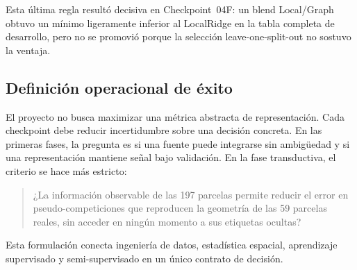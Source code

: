 Esta última regla resultó decisiva en Checkpoint~04F: un blend Local/Graph obtuvo un mínimo
ligeramente inferior al LocalRidge en la tabla completa de desarrollo, pero no se promovió
porque la selección leave-one-split-out no sostuvo la ventaja.

\subsection{Definición operacional de éxito}

El proyecto no busca maximizar una métrica abstracta de representación. Cada checkpoint debe
reducir incertidumbre sobre una decisión concreta. En las primeras fases, la pregunta es si
una fuente puede integrarse sin ambigüedad y si una representación mantiene señal bajo
validación. En la fase transductiva, el criterio se hace más estricto:

\begin{quote}
¿La información observable de las 197 parcelas permite reducir el error en pseudo-competiciones
que reproducen la geometría de las 59 parcelas reales, sin acceder en ningún momento a sus
etiquetas ocultas?
\end{quote}

Esta formulación conecta ingeniería de datos, estadística espacial, aprendizaje supervisado y
semi-supervisado en un único contrato de decisión.
